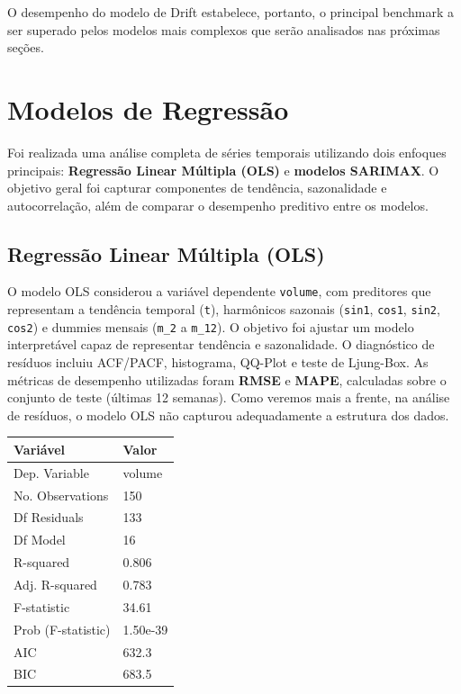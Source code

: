 \documentclass{article}
\begin{document}
O desempenho do modelo de Drift estabelece, portanto, o principal benchmark a ser superado pelos modelos mais complexos que serão analisados nas próximas seções.

\section*{Modelos de Regressão}

Foi realizada uma análise completa de séries temporais utilizando dois enfoques principais: \textbf{Regressão Linear Múltipla (OLS)} e \textbf{modelos SARIMAX}. O objetivo geral foi capturar componentes de tendência, sazonalidade e autocorrelação, além de comparar o desempenho preditivo entre os modelos.

\subsection*{Regressão Linear Múltipla (OLS)}
O modelo OLS considerou a variável dependente \texttt{volume}, com preditores que representam a tendência temporal (\texttt{t}), harmônicos sazonais (\texttt{sin1}, \texttt{cos1}, \texttt{sin2}, \texttt{cos2}) e dummies mensais (\texttt{m\_2} a \texttt{m\_12}).  
O objetivo foi ajustar um modelo interpretável capaz de representar tendência e sazonalidade. O diagnóstico de resíduos incluiu ACF/PACF, histograma, QQ-Plot e teste de Ljung-Box. As métricas de desempenho utilizadas foram \textbf{RMSE} e \textbf{MAPE}, calculadas sobre o conjunto de teste (últimas 12 semanas). Como veremos mais a frente, na análise de resíduos, o modelo OLS não capturou adequadamente a estrutura dos dados.

\begin{table}[h!]
\centering
\begin{tabular}{ll}
\hline
\textbf{Variável} & \textbf{Valor} \\
\hline
Dep. Variable       & volume \\
No. Observations    & 150 \\
Df Residuals        & 133 \\
Df Model            & 16 \\
R-squared           & 0.806 \\
Adj. R-squared      & 0.783 \\
F-statistic         & 34.61 \\
Prob (F-statistic)  & 1.50e-39 \\
AIC                 & 632.3 \\
BIC                 & 683.5 \\
\hline
\end{tabular}
\end{table}
\end{document}
